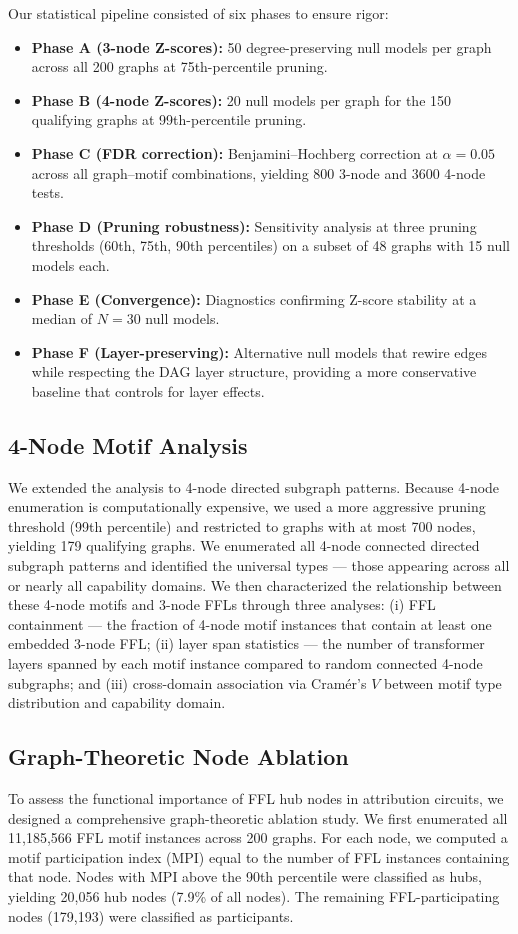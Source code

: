 Our statistical pipeline consisted of six phases to ensure rigor:
\begin{itemize}
\item \textbf{Phase A (3-node Z-scores):} 50 degree-preserving null models per graph across all 200 graphs at 75th-percentile pruning.
\item \textbf{Phase B (4-node Z-scores):} 20 null models per graph for the 150 qualifying graphs at 99th-percentile pruning.
\item \textbf{Phase C (FDR correction):} Benjamini--Hochberg correction at $\alpha=0.05$ across all graph--motif combinations, yielding 800 3-node and 3600 4-node tests.
\item \textbf{Phase D (Pruning robustness):} Sensitivity analysis at three pruning thresholds (60th, 75th, 90th percentiles) on a subset of 48 graphs with 15 null models each.
\item \textbf{Phase E (Convergence):} Diagnostics confirming Z-score stability at a median of $N=30$ null models.
\item \textbf{Phase F (Layer-preserving):} Alternative null models that rewire edges while respecting the DAG layer structure, providing a more conservative baseline that controls for layer effects.
\end{itemize}

\subsection{4-Node Motif Analysis}\label{sec:4node}
We extended the analysis to 4-node directed subgraph patterns. Because 4-node enumeration is computationally expensive, we used a more aggressive pruning threshold (99th percentile) and restricted to graphs with at most 700 nodes, yielding 179 qualifying graphs. We enumerated all 4-node connected directed subgraph patterns and identified the universal types --- those appearing across all or nearly all capability domains. We then characterized the relationship between these 4-node motifs and 3-node FFLs through three analyses: (i) FFL containment --- the fraction of 4-node motif instances that contain at least one embedded 3-node FFL; (ii) layer span statistics --- the number of transformer layers spanned by each motif instance compared to random connected 4-node subgraphs; and (iii) cross-domain association via Cram\'{e}r's $V$ between motif type distribution and capability domain.

\subsection{Graph-Theoretic Node Ablation}\label{sec:ablation}
To assess the functional importance of FFL hub nodes in attribution circuits, we designed a comprehensive graph-theoretic ablation study. We first enumerated all 11,185,566 FFL motif instances across 200 graphs. For each node, we computed a motif participation index (MPI) equal to the number of FFL instances containing that node. Nodes with MPI above the 90th percentile were classified as hubs, yielding 20,056 hub nodes (7.9\% of all nodes). The remaining FFL-participating nodes (179,193) were classified as participants.

